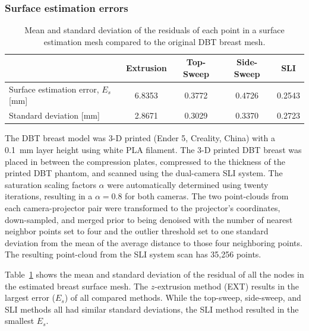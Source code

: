 \subsubsection{Surface estimation errors}
\begin{table}
    \centering
    \caption{Mean and standard deviation of the residuals of each point in a surface estimation mesh compared to the original \ac{DBT} breast mesh.}
        \begin{tabular}{lcccc}
        \toprule
         & Extrusion & Top-Sweep & Side-Sweep & \ac{SLI} \\ \midrule
        Surface estimation error, $E_s$ [mm] & 6.8353 & 0.3772 & 0.4726 & \multicolumn{1}{l}{0.2543} \\
        Standard deviation [mm] & 2.8671 & 0.3029 & 0.3370 & 0.2723 \\ \bottomrule
        \end{tabular}%
    \label{tab:residuals}
\end{table}

The \ac{DBT} breast model was 3-D printed (Ender 5, Creality, China) with a 0.1~mm layer height using white \ac{PLA} filament. The 3-D printed \ac{DBT} breast was placed in between the compression plates, compressed to the thickness of the printed \ac{DBT} phantom, and scanned using the dual-camera \ac{SLI} system. The saturation scaling factors $\alpha$ were automatically determined using twenty iterations, resulting in a $\alpha=0.8$ for both cameras. The two point-clouds from each camera-projector pair were transformed to the projector's coordinates, down-sampled, and merged prior to being denoised with the number of nearest neighbor points set to four and the outlier threshold set to one standard deviation from the mean of the average distance to those four neighboring points. The resulting point-cloud from the \ac{SLI} system scan has 35,256 points.

Table~\ref{tab:residuals} shows the mean and standard deviation of the residual of all the nodes in the estimated breast surface mesh. The $z$-extrusion method (EXT) results in the largest error ($E_s$) of all compared methods. While the top-sweep, side-sweep, and \ac{SLI} methods all had similar standard deviations, the \ac{SLI} method resulted in the smallest $E_s$.

